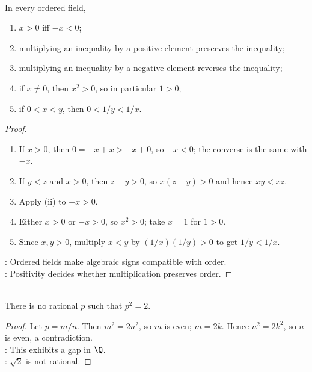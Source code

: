 \begin{proposition} \label{prop:ordered-field-inequality-rules-analysis} \\
In every ordered field,
\begin{enumerate}[label=(\roman*)]
\setlength{\itemsep}{0pt}
\item $x>0$ iff $-x<0$;
\item multiplying an inequality by a positive element preserves the inequality;
\item multiplying an inequality by a negative element reverses the inequality;
\item if $x\neq0$, then $x^2>0$, so in particular $1>0$;
\item if $0<x<y$, then $0<1/y<1/x$.
\end{enumerate}
\begin{proof}
\begin{enumerate}[label=(\roman*)]
\setlength{\itemsep}{0pt}
\item If $x>0$, then $0=-x+x>-x+0$, so $-x<0$; the converse is the same with $-x$.
\item If $y<z$ and $x>0$, then $z-y>0$, so $x(z-y)>0$ and hence $xy<xz$.
\item Apply (ii) to $-x>0$.
\item Either $x>0$ or $-x>0$, so $x^2>0$; take $x=1$ for $1>0$.
\item Since $x,y>0$, multiply $x<y$ by $(1/x)(1/y)>0$ to get $1/y<1/x$.
\end{enumerate}
: Ordered fields make algebraic signs compatible with order.\\
: Positivity decides whether multiplication preserves order.
\end{proof}
\end{proposition}

\begin{proposition} \label{prop:rational-square-root-two-gap} \\
There is no rational $p$ such that $p^2=2$.
\begin{proof} Let $p=m/n$. Then $m^2=2n^2$, so $m$ is even; $m=2k$. Hence $n^2=2k^2$, so $n$ is even, a contradiction.\\
: This exhibits a gap in $\Q$.\\
: $\sqrt{2}$ is not rational.
\end{proof}
\end{proposition}

